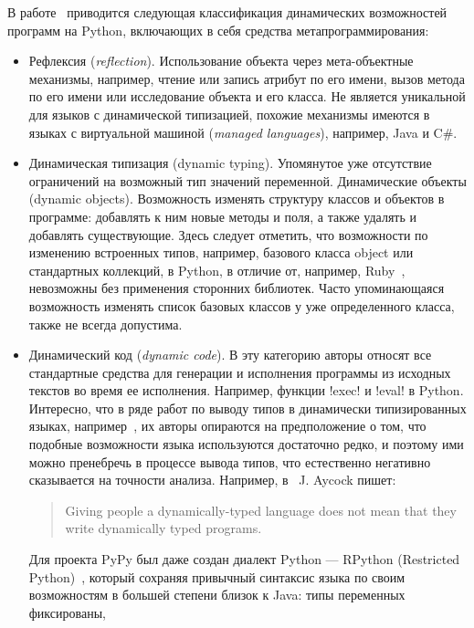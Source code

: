В работе~\cite[]{Holkner2009} приводится следующая классификация динамических возможностей
программ на Python, включающих в себя средства метапрограммирования: 

\begin{itemize}
  \item{Рефлексия (\emph{reflection}). 
      Использование объекта через мета-объектные механизмы, например,
      чтение или запись атрибут по его имени, вызов метода по его имени или
      исследование объекта и его класса. Не является уникальной для языков с
      динамической типизацией, похожие механизмы имеются в языках с виртуальной
      машиной (\emph{managed languages}), например, Java и C\#.}
  \item{Динамическая типизация (dynamic typing). 
      Упомянутое уже отсутствие
      ограничений на возможный тип значений переменной.  Динамические объекты
      (dynamic objects). Возможность изменять структуру классов и объектов в
      программе: добавлять к ним новые методы и поля, а также удалять и добавлять
      существующие. Здесь следует отметить, что возможности по изменению встроенных
      типов, например, базового класса object или стандартных коллекций, в Python, в
      отличие от, например, Ruby~\cite{Madsen2007}, невозможны без применения сторонних библиотек.
      Часто упоминающаяся возможность изменять список базовых классов у уже
      определенного класса, также не всегда допустима.}
  \item{  
      Динамический код (\emph{dynamic code}).
      В эту категорию авторы относят все стандартные средства для
      генерации и исполнения программы из исходных текстов во время ее
      исполнения.  Например, функции !exec! и !eval! в Python.  Интересно, что в ряде
      работ по выводу типов в динамически типизированных языках,
      например~\cite{Salib2004,Aycock2000},  их авторы опираются на предположение о
      том, что подобные возможности языка используются достаточно редко, и поэтому
      ими можно пренебречь в процессе вывода типов, что естественно негативно
      сказывается на точности анализа. Например, в~\cite{Aycock2000} J. Aycock пишет:
      \begin{quote}
        Giving people a dynamically-typed language does not mean that they write
        dynamically typed programs.
      \end{quote}
      Для проекта PyPy был даже создан диалект Python --- RPython (Restricted
      Python)~\cite{Ancona2007}, который сохраняя привычный синтаксис языка по своим
      возможностям в большей степени близок к Java: типы переменных фиксированы,
}
\end{itemize}
